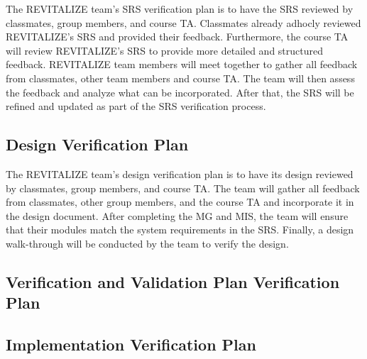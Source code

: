 \documentclass[12pt, titlepage]{article}
\begin{document}


The REVITALIZE team's SRS verification plan is to have the SRS reviewed by classmates, group members, and course TA. Classmates already adhocly reviewed REVITALIZE's SRS and provided their feedback. Furthermore, the course TA will review REVITALIZE's SRS to provide more detailed and structured feedback. REVITALIZE team members will meet together to gather all feedback from classmates, other team members and course TA. The team will then assess the feedback and analyze what can be incorporated. After that, the SRS will be refined and updated as part of the SRS verification process.

\subsection{Design Verification Plan}




The REVITALIZE team's design verification plan is to have its design reviewed by classmates, group members, and course TA. The team will gather all feedback from classmates, other group members, and the course TA and incorporate it in the design document. After completing the MG and MIS, the team will ensure that their modules match the system requirements in the SRS. Finally, a design walk-through will be conducted by the team to verify the design.

\subsection{Verification and Validation Plan Verification Plan}




\subsection{Implementation Verification Plan}
\end{document}
